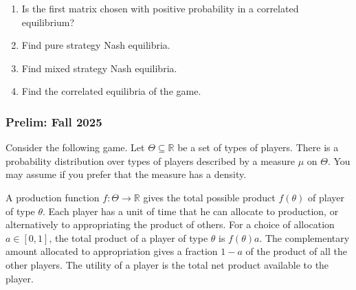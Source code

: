 \documentclass[11pt,english]{article}
\begin{document}
\begin{enumerate}
\begin{enumerate}
\begin{solution}
        \end{solution}
 
        \item[(b)] Is the first matrix chosen with positive probability in a
            correlated equilibrium?
        \begin{solution}
 
        \end{solution}
 
        \item[(c)] Find pure strategy Nash equilibria.
        \begin{solution}
 
        \end{solution}
 
        \item[(d)] Find mixed strategy Nash equilibria.
        \begin{solution}
 
        \end{solution}
 
        \item[(e)] Find the correlated equilibria of the game.
        \begin{solution}
 
        \end{solution}
    \end{enumerate}
\end{enumerate}

\subsubsection{Prelim: Fall 2025}\label{Rustichini Prelim: Fall 2025}
Consider the following game. Let $\Theta \subseteq \mathbb{R}$ be a set of
types of players. There is a probability distribution over types of players
described by a measure $\mu$ on $\Theta$. You may assume if you prefer that
the measure has a density.
 
A production function $f : \Theta \to \mathbb{R}$ gives the total possible
product $f(\theta)$ of player of type $\theta$. Each player has a unit of time
that he can allocate to production, or alternatively to appropriating the
product of others. For a choice of allocation $a \in [0,1]$, the total product
of a player of type $\theta$ is $f(\theta)a$. The complementary amount
allocated to appropriation gives a fraction $1 - a$ of the product of all the
other players. The utility of a player is the total net product available to
the player.
 
\end{document}
